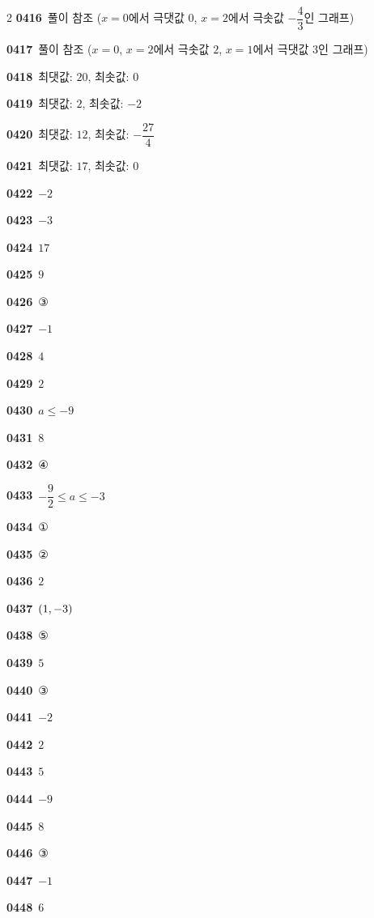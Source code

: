 \documentclass[10pt,a4paper]{article}
\begin{document}
\begin{multicols}{2}
\noindent\textbf{0416}\ 풀이 참조 ($x=0$에서 극댓값 $0$, $x=2$에서 극솟값 $-\dfrac{4}{3}$인 그래프)\par
\noindent\textbf{0417}\ 풀이 참조 ($x=0$, $x=2$에서 극솟값 $2$, $x=1$에서 극댓값 $3$인 그래프)\par
\noindent\textbf{0418}\ 최댓값: $20$, 최솟값: $0$\par
\noindent\textbf{0419}\ 최댓값: $2$, 최솟값: $-2$\par
\noindent\textbf{0420}\ 최댓값: $12$, 최솟값: $-\dfrac{27}{4}$\par
\noindent\textbf{0421}\ 최댓값: $17$, 최솟값: $0$\par
\noindent\textbf{0422}\ $-2$\par
\noindent\textbf{0423}\ $-3$\par
\noindent\textbf{0424}\ $17$\par
\noindent\textbf{0425}\ $9$\par
\noindent\textbf{0426}\ ③\par
\noindent\textbf{0427}\ $-1$\par
\noindent\textbf{0428}\ $4$\par
\noindent\textbf{0429}\ $2$\par
\noindent\textbf{0430}\ $a\le -9$\par
\noindent\textbf{0431}\ $8$\par
\noindent\textbf{0432}\ ④\par
\noindent\textbf{0433}\ $-\dfrac{9}{2}\le a\le -3$\par
\noindent\textbf{0434}\ ①\par
\noindent\textbf{0435}\ ②\par
\noindent\textbf{0436}\ $2$\par
\noindent\textbf{0437}\ $(1{,}\mkern3mu\mathopen{}-3)$\par
\noindent\textbf{0438}\ ⑤\par
\noindent\textbf{0439}\ $5$\par
\noindent\textbf{0440}\ ③\par
\noindent\textbf{0441}\ $-2$\par
\noindent\textbf{0442}\ $2$\par
\noindent\textbf{0443}\ $5$\par
\noindent\textbf{0444}\ $-9$\par
\noindent\textbf{0445}\ $8$\par
\noindent\textbf{0446}\ ③\par
\noindent\textbf{0447}\ $-1$\par
\noindent\textbf{0448}\ $6$\par

\end{multicols}
\end{document}
